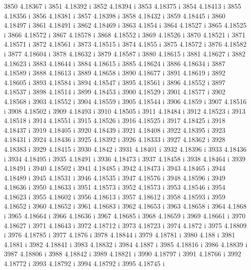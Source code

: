  3850  4.18367  i
 3851  4.18392  i
 3852  4.18394  i
 3853  4.18375  i
 3854  4.18413  i
 3855  4.18356  i
 3856  4.18381  i
 3857  4.18398  i
 3858  4.18432  i
 3859  4.18445  i
 3860  4.18497  i
 3861  4.18491  i
 3862  4.18469  i
 3863  4.1854  i
 3864  4.18527  i
 3865  4.18525  i
 3866  4.18572  i
 3867  4.18578  i
 3868  4.18552  i
 3869  4.18526  i
 3870  4.18521  i
 3871  4.18571  i
 3872  4.18561  i
 3873  4.18515  i
 3874  4.1855  i
 3875  4.18572  i
 3876  4.18582  i
 3877  4.18604  i
 3878  4.18632  i
 3879  4.18587  i
 3880  4.18615  i
 3881  4.18627  i
 3882  4.18623  i
 3883  4.18644  i
 3884  4.18615  i
 3885  4.18624  i
 3886  4.18634  i
 3887  4.18589  i
 3888  4.18613  i
 3889  4.18658  i
 3890  4.18677  i
 3891  4.18619  i
 3892  4.18605  i
 3893  4.18584  i
 3894  4.18547  i
 3895  4.18561  i
 3896  4.18552  i
 3897  4.18537  i
 3898  4.18514  i
 3899  4.18453  i
 3900  4.18529  i
 3901  4.18577  i
 3902  4.18568  i
 3903  4.18552  i
 3904  4.18559  i
 3905  4.18544  i
 3906  4.1859  i
 3907  4.18516  i
 3908  4.18502  i
 3909  4.18493  i
 3910  4.18505  i
 3911  4.18484  i
 3912  4.18523  i
 3913  4.18518  i
 3914  4.18551  i
 3915  4.18526  i
 3916  4.18525  i
 3917  4.18425  i
 3918  4.18437  i
 3919  4.18405  i
 3920  4.18439  i
 3921  4.18408  i
 3922  4.18395  i
 3923  4.18431  i
 3924  4.18436  i
 3925  4.18392  i
 3926  4.18333  i
 3927  4.18362  i
 3928  4.18383  i
 3929  4.18415  i
 3930  4.1842  i
 3931  4.18401  i
 3932  4.18396  i
 3933  4.18436  i
 3934  4.18495  i
 3935  4.18491  i
 3936  4.18473  i
 3937  4.18458  i
 3938  4.18464  i
 3939  4.18491  i
 3940  4.18502  i
 3941  4.18485  i
 3942  4.18473  i
 3943  4.18465  i
 3944  4.18489  i
 3945  4.18531  i
 3946  4.18535  i
 3947  4.18576  i
 3948  4.18596  i
 3949  4.18636  i
 3950  4.18633  i
 3951  4.18573  i
 3952  4.18573  i
 3953  4.18546  i
 3954  4.18623  i
 3955  4.18602  i
 3956  4.18613  i
 3957  4.18612  i
 3958  4.18593  i
 3959  4.18652  i
 3960  4.18652  i
 3961  4.18683  i
 3962  4.18653  i
 3963  4.18658  i
 3964  4.1868  i
 3965  4.18664  i
 3966  4.18636  i
 3967  4.18685  i
 3968  4.18659  i
 3969  4.18661  i
 3970  4.18627  i
 3971  4.18643  i
 3972  4.18712  i
 3973  4.18723  i
 3974  4.1872  i
 3975  4.18809  i
 3976  4.18785  i
 3977  4.1876  i
 3978  4.18844  i
 3979  4.18781  i
 3980  4.188  i
 3981  4.1881  i
 3982  4.18841  i
 3983  4.18832  i
 3984  4.1887  i
 3985  4.18816  i
 3986  4.18839  i
 3987  4.18806  i
 3988  4.18842  i
 3989  4.18821  i
 3990  4.18797  i
 3991  4.18766  i
 3992  4.18772  i
 3993  4.18792  i
 3994  4.18792  i
 3995  4.18745  i
